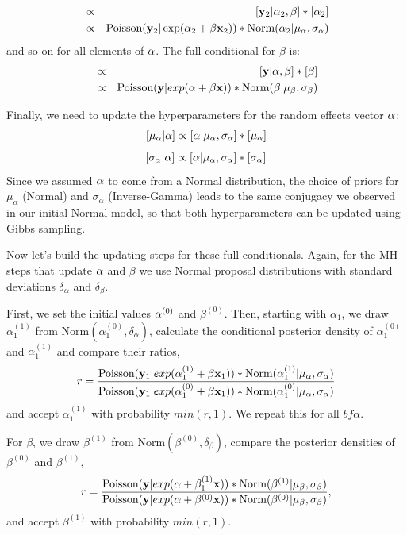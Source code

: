 \begin{eqnarray*}
[\alpha_2|\alpha_1,\alpha_3,\ldots,\alpha_i,\beta,{\bf y}_{2}] & \propto&  [{\bf y}_{2}|\alpha_2,\beta] * [\alpha_2] \\
	 & \propto  & \mbox{Poisson}({\bf y}_{2}| \exp(\alpha_2 + \beta {\bf x}_2)) * \mbox{Norm}(\alpha_2|\mu_{\alpha}, \sigma_{\alpha})
\end{eqnarray*}
and so on for all elements of ${\bf \alpha}$. The full-conditional for $\beta$ is:
\begin{eqnarray*}
[\beta|\alpha,{\bf y}] &\propto & [{\bf y}|\alpha,\beta] * [\beta] \\
	 &\propto& \mbox{Poisson}({\bf y}|exp(\alpha + \beta {\bf x})) *\mbox{Norm}(\beta|\mu_{\beta}, \sigma_{\beta})
\end{eqnarray*}

Finally, we need to update the hyperparameters for the random effects
vector ${\bf \alpha}$:
\[
[\mu_{\alpha}|{\bf \alpha}] \propto [{\bf \alpha}|\mu_{\alpha}, \sigma_{\alpha}] *[\mu_{\alpha}]
\]
\[
[\sigma_{\alpha}|{\bf\alpha}] \propto [\alpha|\mu_{\alpha}, \sigma_{\alpha}] *[\sigma_{\alpha}]
\]
Since we assumed ${\bf \alpha}$ to come from a Normal distribution,
the choice of priors for $\mu_{\alpha}$ (Normal) and $\sigma_{\alpha}$
(Inverse-Gamma) leads to the same conjugacy we observed in our initial
Normal model, so that both hyperparameters can be updated using Gibbs
sampling.

Now let's build the updating steps for these full conditionals. Again,
for the MH steps that update ${\bf \alpha}$ and $\beta$ we use Normal
proposal distributions with standard deviations $\delta_{\alpha}$ and
$\delta_{\beta}$.

First, we set the initial values ${\bf \alpha}^{(0)}$ and
$\beta^{(0)}$. Then, starting with $\alpha_1$, we draw
$\alpha_1^{(1)}$ from $\mbox{Norm}(\alpha_1^{(0)}, \delta_{\alpha})$,
calculate the conditional posterior density of $\alpha_1^{(0)}$ and
$\alpha_1^{(1)}$ and compare their ratios,
\[
r = \frac{\mbox{Poisson}({\bf y}_{1}|exp(\alpha_1^{(1)} + \beta {\bf x}_1)) *
  \mbox{Norm}(\alpha_1^{(1)}|\mu_{\alpha}, \sigma_{\alpha})} {\mbox{Poisson}({\bf y}_{1}|exp(\alpha_1^{(0)} + \beta {\bf x}_1)) * \mbox{Norm}(\alpha_1^{(0)}|\mu_{\alpha}, \sigma_{\alpha})}
\]
and accept $\alpha_1^{(1)}$ with probability $min(r,1)$. We repeat this for all ${bf \alpha}$.

For $\beta$, we draw $\beta^{(1)}$ from $\mbox{Norm} (\beta^{(0)}, \delta_{\beta})$, compare the posterior densities of $\beta^{(0)}$ and $\beta^{(1)}$,
\[
r = \frac{\mbox{Poisson}({\bf y}|exp({\bf \alpha} + \beta_1^{(1)}{\bf x}))
  *\mbox{Norm}(\beta^{(1)}|\mu_{\beta}, \sigma_{\beta})} { \mbox{Poisson}({\bf
    y}|exp({\bf \alpha} + \beta^{(0)}{\bf x})) *\mbox{Norm}(\beta^{(0)}|\mu_{\beta}, \sigma_{\beta})},
\]
and accept $\beta^{(1)}$  with probability $min(r,1)$.

